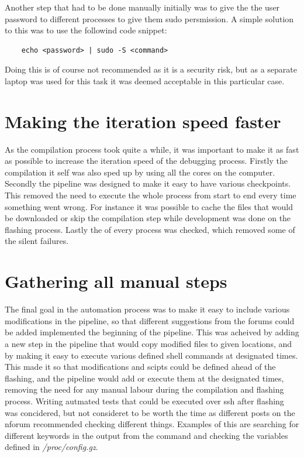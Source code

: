 Another step that had to be done manually initially was to give the the user password to different processes to give them sudo persmission.
A simple solution to this was to use the followind code snippet:
\begin{verbatim}
    echo <password> | sudo -S <command>
\end{verbatim}
Doing this is of course not recommended as it is a security risk, but as a separate laptop was used for this task it was deemed acceptable in this particular case.

\section{Making the iteration speed faster}
As the compilation process took quite a while, it was important to make it as fast as possible to increase the iteration speed of the debugging process.
Firstly the compilation it self was also sped up by using all the cores on the computer.
Secondly the pipeline was designed to make it easy to have various checkpoints.
This removed the need to execute the whole process from start to end every time something went wrong.
For instance it was possible to cache the files that would be downloaded or skip the compilation step while development was done on the flashing process.
Lastly the  of every process was checked, which removed some of the silent failures.

\section{Gathering all manual steps}
The final goal in the automation process was to make it easy to include various modifications in the pipeline, so that different suggestions from the forums could be added implemented the beginning of the pipeline.
This was acheived by adding a new step in the pipeline that would copy modified files to given locations, and by making it easy to execute various defined shell commands at designated times.
This made it so that modifications and scipts could be defined ahead of the flashing, and the pipeline would add or execute them at the designated times, removing the need for any manual labour during the compilation and flashing process.
Writing autmated tests that could be executed over \gls{ssh} after flashing was concidered, but not consideret to be worth the time as different posts on the \gls{nforum} recommended checking different things.
Examples of this are searching for different keywords in the output from the  command and checking the variables defined in \textit{/proc/config.gz}.

